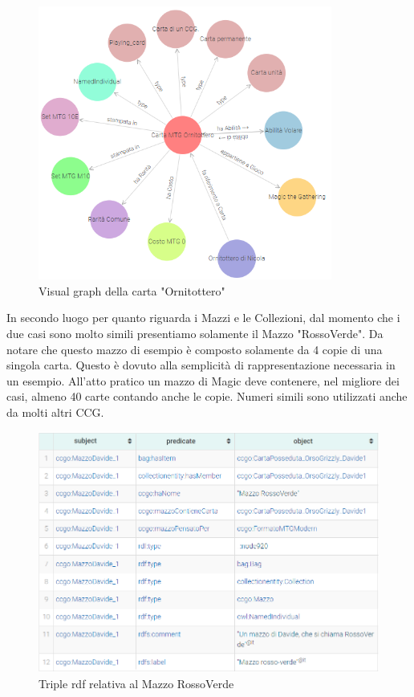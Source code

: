 \documentclass[12pt]{article}
\begin{document}
\begin{figure}[H]
    \centering
    \includegraphics[height=9cm]{files/grafo_ornitottero.png}
    \caption{Visual graph della carta "Ornitottero"}
    \label{fig:grafo_ornitottero}
\end{figure}

In secondo luogo per quanto riguarda i Mazzi e le Collezioni, dal momento che i due casi sono molto simili presentiamo solamente il Mazzo "RossoVerde". Da notare che questo mazzo di esempio è composto solamente da 4 copie di una singola carta. Questo è dovuto alla semplicità di rappresentazione necessaria in un esempio. All'atto pratico un mazzo di Magic deve contenere, nel migliore dei casi, almeno 40 carte contando anche le copie. Numeri simili sono utilizzati anche da molti altri CCG.

\begin{figure}[H]
    \centering
    \includegraphics[width=13cm]{files/triple_mazzo.png}
    \caption{Triple rdf relativa al Mazzo RossoVerde}
    \label{fig:triple_mazzo}
\end{figure}
\end{document}
